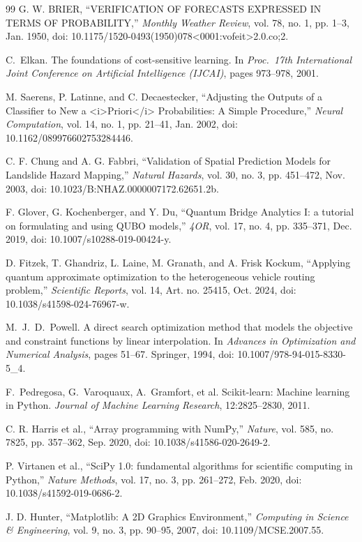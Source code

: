 \documentclass[10pt,twocolumn]{article}
\begin{document}
{\begin{thebibliography}{99}
G. W. BRIER, ``VERIFICATION OF FORECASTS EXPRESSED IN TERMS OF PROBABILITY,'' \emph{Monthly Weather Review}, vol. 78, no. 1, pp. 1--3, Jan. 1950, doi: 10.1175/1520-0493(1950)078<0001:vofeit>2.0.co;2.

C.~Elkan. The foundations of cost-sensitive learning. In \emph{Proc.\ 17th International Joint Conference on Artificial Intelligence (IJCAI)}, pages 973--978, 2001.

M. Saerens, P. Latinne, and C. Decaestecker, ``Adjusting the Outputs of a Classifier to New a <i>Priori</i> Probabilities: A Simple Procedure,'' \emph{Neural Computation}, vol. 14, no. 1, pp. 21--41, Jan. 2002, doi: 10.1162/089976602753284446.

C. F. Chung and A. G. Fabbri, ``Validation of Spatial Prediction Models for Landslide Hazard Mapping,'' \emph{Natural Hazards}, vol. 30, no. 3, pp. 451--472, Nov. 2003, doi: 10.1023/B:NHAZ.0000007172.62651.2b.

F. Glover, G. Kochenberger, and Y. Du, ``Quantum Bridge Analytics I: a tutorial on formulating and using QUBO models,'' \emph{4OR}, vol. 17, no. 4, pp. 335--371, Dec. 2019, doi: 10.1007/s10288-019-00424-y.

D. Fitzek, T. Ghandriz, L. Laine, M. Granath, and A. Frisk Kockum, ``Applying quantum approximate optimization to the heterogeneous vehicle routing problem,'' \emph{Scientific Reports}, vol. 14, Art. no. 25415, Oct. 2024, doi: 10.1038/s41598-024-76967-w.

M.~J.~D.~Powell. A direct search optimization method that models the objective and constraint functions by linear interpolation. In \emph{Advances in Optimization and Numerical Analysis}, pages 51--67. Springer, 1994, doi: 10.1007/978-94-015-8330-5\_4.

F.~Pedregosa, G.~Varoquaux, A.~Gramfort, et al. Scikit-learn: Machine learning in Python. \emph{Journal of Machine Learning Research}, 12:2825--2830, 2011.

C. R. Harris et al., ``Array programming with NumPy,'' \emph{Nature}, vol. 585, no. 7825, pp. 357--362, Sep. 2020, doi: 10.1038/s41586-020-2649-2.

P. Virtanen et al., ``SciPy 1.0: fundamental algorithms for scientific computing in Python,'' \emph{Nature Methods}, vol. 17, no. 3, pp. 261--272, Feb. 2020, doi: 10.1038/s41592-019-0686-2.

J. D. Hunter, ``Matplotlib: A 2D Graphics Environment,'' \emph{Computing in Science \& Engineering}, vol. 9, no. 3, pp. 90--95, 2007, doi: 10.1109/MCSE.2007.55.

\end{thebibliography}
}
\end{document}
